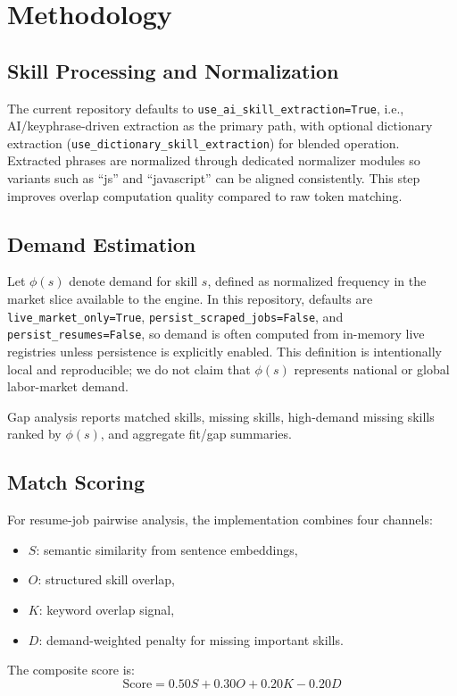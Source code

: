 \documentclass[conference]{IEEEtran}
\begin{document}
\section{Methodology}
\subsection{Skill Processing and Normalization}
The current repository defaults to \texttt{use\_ai\_skill\_extraction=True}, i.e., AI/keyphrase-driven extraction as the primary path, with optional dictionary extraction (\texttt{use\_dictionary\_skill\_extraction}) for blended operation. Extracted phrases are normalized through dedicated normalizer modules so variants such as ``js'' and ``javascript'' can be aligned consistently. This step improves overlap computation quality compared to raw token matching.

\subsection{Demand Estimation}
Let $\phi(s)$ denote demand for skill $s$, defined as normalized frequency in the market slice available to the engine. In this repository, defaults are \texttt{live\_market\_only=True}, \texttt{persist\_scraped\_jobs=False}, and \texttt{persist\_resumes=False}, so demand is often computed from in-memory live registries unless persistence is explicitly enabled. This definition is intentionally local and reproducible; we do not claim that $\phi(s)$ represents national or global labor-market demand.

Gap analysis reports matched skills, missing skills, high-demand missing skills ranked by $\phi(s)$, and aggregate fit/gap summaries.

\subsection{Match Scoring}
For resume-job pairwise analysis, the implementation combines four channels:
\begin{itemize}
    \item $S$: semantic similarity from sentence embeddings,
    \item $O$: structured skill overlap,
    \item $K$: keyword overlap signal,
    \item $D$: demand-weighted penalty for missing important skills.
\end{itemize}

The composite score is:
\begin{equation}
\text{Score} = 0.50S + 0.30O + 0.20K - 0.20D
\end{equation}
\end{document}
